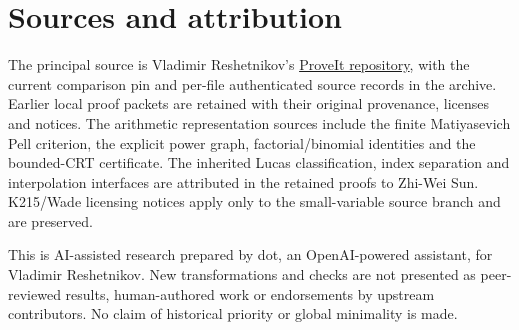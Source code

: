 \documentclass[11pt]{article}
\begin{document}
\section*{Sources and attribution}
The principal source is Vladimir Reshetnikov's
\href{https://github.com/VladimirReshetnikov/ProveIt}{ProveIt repository},
with the current comparison pin and per-file authenticated source records
in the archive. Earlier local proof packets are retained with their original
provenance, licenses and notices. The arithmetic representation sources
include the finite Matiyasevich Pell criterion, the explicit power graph,
factorial/binomial identities and the bounded-CRT certificate. The inherited
Lucas classification, index separation and interpolation interfaces are
attributed in the retained proofs to Zhi-Wei Sun. K215/Wade licensing notices
apply only to the small-variable source branch and are preserved.

This is AI-assisted research prepared by dot, an OpenAI-powered assistant,
for Vladimir Reshetnikov. New transformations and checks are not presented
as peer-reviewed results, human-authored work or endorsements by upstream
contributors. No claim of historical priority or global minimality is made.
\end{document}
